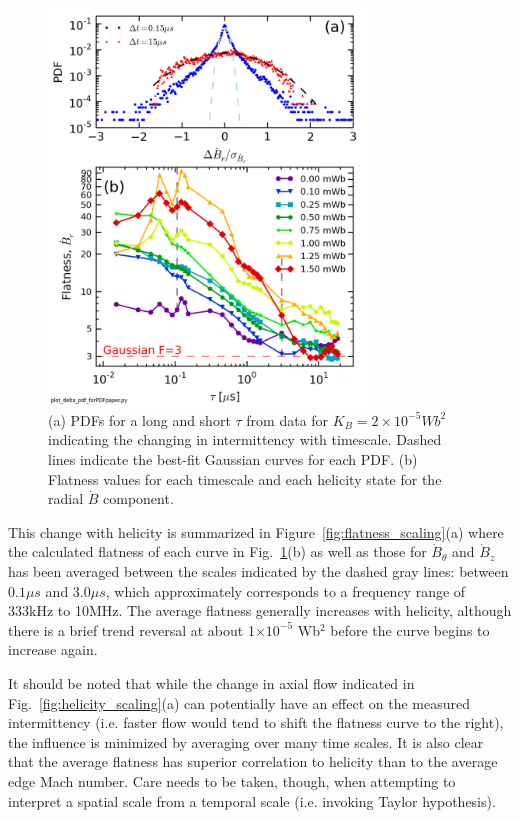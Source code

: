 \documentclass[aps,prl,amsmath,amssymb,reprint,superscriptaddress]{revtex4-1} %
\begin{document}
\begin{figure}[!htbp]
\centerline{
\includegraphics[width=8.5cm]{Br_flatness.png}}
\caption{\label{fig:Br_flatness} (a) PDFs for a long and short $\tau$ from data for $K_{B} = 2\times 10^{-5} Wb^{2}$ indicating the changing in intermittency with timescale. Dashed lines indicate the best-fit Gaussian curves for each PDF. (b) Flatness values for each timescale and each helicity state for the radial $\dot{B}$ component.}
\end{figure}

This change with helicity is summarized in Figure~\ref{fig:flatness_scaling}(a) where the calculated flatness of each curve in Fig.~\ref{fig:Br_flatness}(b) as well as those for $\dot{B}_{\theta}$ and $\dot{B}_{z}$ has been averaged between the scales indicated by the dashed gray lines: between $0.1\mu s$ and $3.0\mu s$, which approximately corresponds to a frequency range of 333kHz to 10MHz. The average flatness generally increases with helicity, although there is a brief trend reversal at about 1$\times 10^{-5}$ Wb$^{2}$ before the curve begins to increase again.

It should be noted that while the change in axial flow indicated in Fig.~\ref{fig:helicity_scaling}(a) can potentially have an effect on the measured intermittency (i.e. faster flow would tend to shift the flatness curve to the right), the influence is minimized by averaging over many time scales. It is also clear that the average flatness has superior correlation to helicity than to the average edge Mach number. Care needs to be taken, though, when attempting to interpret a spatial scale from a temporal scale (i.e. invoking Taylor hypothesis).
\end{document}
